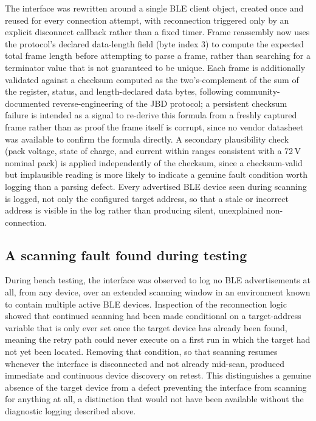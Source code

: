 The interface was rewritten around a single BLE client object, created once and reused for every connection attempt, with reconnection triggered only by an explicit disconnect callback rather than a fixed timer. Frame reassembly now uses the protocol's declared data-length field (byte index 3) to compute the expected total frame length before attempting to parse a frame, rather than searching for a terminator value that is not guaranteed to be unique. Each frame is additionally validated against a checksum computed as the two's-complement of the sum of the register, status, and length-declared data bytes, following community-documented reverse-engineering of the JBD protocol; a persistent checksum failure is intended as a signal to re-derive this formula from a freshly captured frame rather than as proof the frame itself is corrupt, since no vendor datasheet was available to confirm the formula directly. A secondary plausibility check (pack voltage, state of charge, and current within ranges consistent with a 72\,V nominal pack) is applied independently of the checksum, since a checksum-valid but implausible reading is more likely to indicate a genuine fault condition worth logging than a parsing defect. Every advertised BLE device seen during scanning is logged, not only the configured target address, so that a stale or incorrect address is visible in the log rather than producing silent, unexplained non-connection.

\subsection{A scanning fault found during testing}

During bench testing, the interface was observed to log no BLE advertisements at all, from any device, over an extended scanning window in an environment known to contain multiple active BLE devices. Inspection of the reconnection logic showed that continued scanning had been made conditional on a target-address variable that is only ever set once the target device has already been found, meaning the retry path could never execute on a first run in which the target had not yet been located. Removing that condition, so that scanning resumes whenever the interface is disconnected and not already mid-scan, produced immediate and continuous device discovery on retest. This distinguishes a genuine absence of the target device from a defect preventing the interface from scanning for anything at all, a distinction that would not have been available without the diagnostic logging described above.

